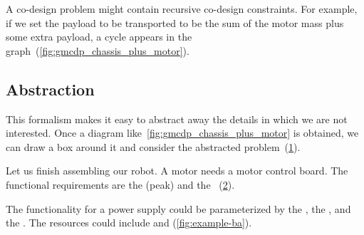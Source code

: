 \begin{example}

    A co-design problem might contain recursive co-design constraints.
    For example, if we set the payload to be transported to be the sum of the motor mass plus some extra payload, a cycle appears in the graph~(\cref{fig:gmcdp_chassis_plus_motor}).

    \begin{figure*}[h!]
        \centering
        \caption{}
        \label{fig:gmcdp_chassis_plus_motor}
    \end{figure*}

    \FloatBarrier \vfill\clearpage

    \subsection{Abstraction}
    This formalism makes it easy to abstract away the details in which we are not interested.
    Once a diagram like~\cref{fig:gmcdp_chassis_plus_motor} is obtained, we can draw a box around it and consider the abstracted problem~(\cref{fig:gmcdp_chassis_plus_motor-1}).

    \begin{figure}[h!]
        \centering
        \caption{}
        \label{fig:gmcdp_chassis_plus_motor-1}
    \end{figure}


    \label{exa:finish}Let us finish assembling our robot.
    A motor needs a motor control board.
    The functional requirements are the (peak)
     and the ~(\cref{fig:mcb}).

    \begin{figure}[h!]
        \centering
        \caption{}
        \label{fig:mcb}
    \end{figure}


    The functionality for a power supply could be parameterized by the , the , and the .
    The resources could include  and  (\cref{fig:example-ba}).


\end{example}
